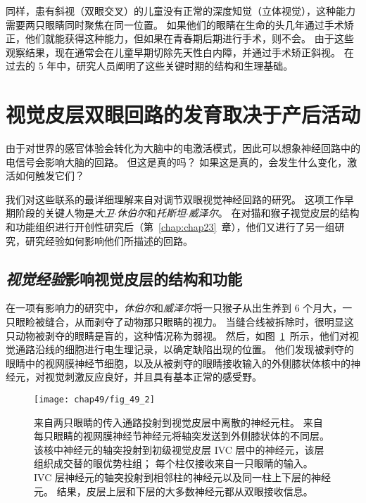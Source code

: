 同样，患有斜视（双眼交叉）的儿童没有正常的深度知觉（立体视觉），这种能力需要两只眼睛同时聚焦在同一位置。
如果他们的眼睛在生命的头几年通过手术矫正，他们就能获得这种能力，但如果在青春期后期进行手术，则不会。
由于这些观察结果，现在通常会在儿童早期切除先天性白内障，并通过手术矫正斜视。
在过去的 5 年中，研究人员阐明了这些关键时期的结构和生理基础。



\section{视觉皮层双眼回路的发育取决于产后活动}

由于对世界的感官体验会转化为大脑中的电激活模式，因此可以想象神经回路中的电信号会影响大脑的回路。
但这是真的吗？
如果这是真的，会发生什么变化，激活如何触发它们？


我们对这些联系的最详细理解来自对调节双眼视觉神经回路的研究。
这项工作早期阶段的关键人物是\textit{大卫$\cdot$休伯尔}和\textit{托斯坦$\cdot$威泽尔}。
在对猫和猴子视觉皮层的结构和功能组织进行开创性研究后（第~\ref{chap:chap23}~章），他们又进行了另一组研究，研究经验如何影响他们所描述的回路。



\subsection{\textit{视觉经验}影响视觉皮层的结构和功能}

在一项有影响力的研究中，\textit{休伯尔}和\textit{威泽尔}将一只猴子从出生养到 6 个月大，一只眼睑被缝合，从而剥夺了动物那只眼睛的视力。
当缝合线被拆除时，很明显这只动物被剥夺的眼睛是盲的，这种情况称为弱视。
然后，如图~\ref{fig:49_2}~所示，他们对视觉通路沿线的细胞进行电生理记录，以确定缺陷出现的位置。
他们发现被剥夺的眼睛中的视网膜神经节细胞，以及从被剥夺的眼睛接收输入的外侧膝状体核中的神经元，对视觉刺激反应良好，并且具有基本正常的感受野。


\begin{figure}[htbp]
	\centering
	\texttt{[image: chap49/fig\_49\_2]}
	\caption{来自两只眼睛的传入通路投射到视觉皮层中离散的神经元柱。
		来自每只眼睛的视网膜神经节神经元将轴突发送到外侧膝状体的不同层。
		该核中神经元的轴突投射到初级视觉皮层 IVC 层中的神经元，该层组织成交替的眼优势柱组；
		每个柱仅接收来自一只眼睛的输入。
		IVC 层神经元的轴突投射到相邻柱的神经元以及同一柱上下层的神经元。
		结果，皮层上层和下层的大多数神经元都从双眼接收信息。}
	\label{fig:49_2}
\end{figure}


